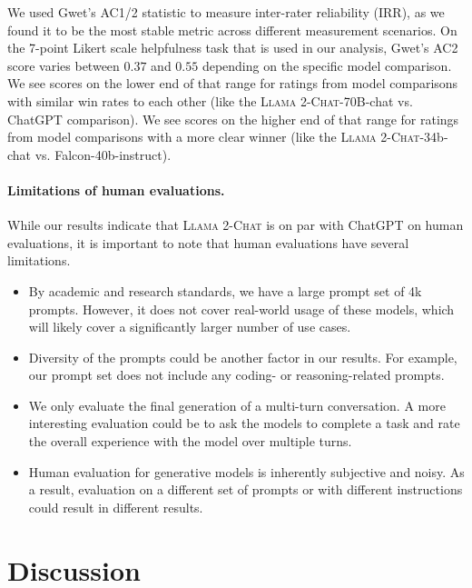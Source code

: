 \documentclass{article}
\newcommand{\modelname}{\textsc{Llama 2-Chat}\xspace}
\begin{document}
We used Gwet's AC1/2 statistic \citep{gwet-2008-computing,gwet-2014-handbook} to measure inter-rater reliability (IRR), as we found it to be the most stable metric across different measurement scenarios. On the 7-point Likert scale helpfulness task that is used in our analysis, Gwet's AC2 score varies between $0.37$ and $0.55$ depending on the specific model comparison. We see scores on the lower end of that range for ratings from model comparisons with similar win rates to each other (like the \modelname-70B-chat vs. ChatGPT comparison). We see scores on the higher end of that range for ratings from model comparisons with a more clear winner (like the \modelname-34b-chat vs. Falcon-40b-instruct).

\paragraph{Limitations of human evaluations.}

While our results indicate that \modelname is on par with ChatGPT on human evaluations, it is important to note that human evaluations have several limitations.

\begin{itemize}[leftmargin=*]
    \item By academic and research standards, we have a large prompt set of 4k prompts. However, it does not cover real-world usage of these models, which will likely cover a significantly larger number of use cases.
    \item Diversity of the prompts could be another factor in our results. For example, our prompt set does not include any coding- or reasoning-related prompts.
    \item We only evaluate the final generation of a multi-turn conversation. A more interesting evaluation could be to ask the models to complete a task and rate the overall experience with the model over multiple turns.
    \item Human evaluation for generative models is inherently subjective and noisy. As a result, evaluation on a different set of prompts or with different instructions could result in different results. 
\end{itemize}



\section{Discussion}
\label{sec:results_and_discussion}
\end{document}
